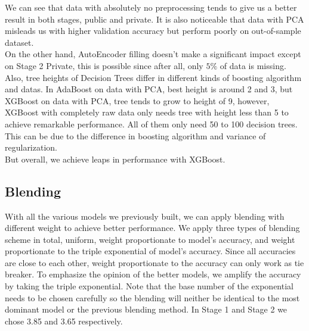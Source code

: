 \documentclass[10pt,a4paper]{article}
\begin{document}
We can see that data with absolutely no preprocessing tends to give us a better result in both stages, public and private. It is also noticeable that data with PCA misleads us with higher validation accuracy but perform poorly on out-of-sample dataset. \\
On the other hand, AutoEncoder filling doesn't make a significant impact except on Stage 2 Private, this is possible since after all, only $5\%$ of data is missing.\\
Also, tree heights of Decision Trees differ in different kinds of boosting algorithm and datas. In AdaBoost on data with PCA, best height is around 2 and 3, but XGBoost on data with PCA, tree tends to grow to height of 9, however, XGBoost with completely raw data only needs tree with height less than 5 to achieve remarkable performance. All of them only need 50 to 100 decision trees. This can be due to the difference in boosting algorithm and variance of regularization.\\
But overall, we achieve leaps in performance with XGBoost.



\subsection{Blending}
With all the various models we previously built, we can apply blending with different weight to achieve better performance. 
We apply three types of blending scheme in total, uniform, weight proportionate to model's accuracy, and weight proportionate to the triple exponential of model's accuracy. 
Since all accuracies are close to each other, weight proportionate to the accuracy can only work as tie breaker. To emphasize the opinion of the better models, we amplify the accuracy by taking the triple exponential. 
Note that the base number of the exponential needs to be chosen carefully so the blending will neither be identical to the most dominant model or the previous blending method. In Stage 1 and Stage 2 we chose 3.85 and 3.65 respectively.
\end{document}
